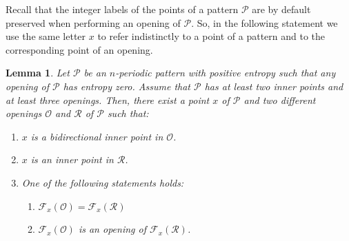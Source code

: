 \documentclass[a4paper]{amsart}
\newtheorem{lemma}[theorem]{Lemma}
\theoremstyle{definition}
\begin{document}
Recall that the integer labels of the points of a pattern $\mathcal{P}$ are by default preserved when performing an opening of $\mathcal{P}$. So, in the following statement we use the same letter $x$ to refer indistinctly to a point of a pattern and to the corresponding point of an opening.

\begin{lemma}\label{2inners_3op_QR}
Let $\mathcal{P}$ be an $n$-periodic pattern with positive entropy such that any opening of $\mathcal{P}$ has entropy zero.
Assume that $\mathcal{P}$ has at least two inner points and at least three openings. Then, there exist a point $x$ of $\mathcal{P}$ and
two different openings $\mathcal{O}$ and $\mathcal{R}$ of $\mathcal{P}$ such that:
\begin{enumerate}
\item $x$ is a bidirectional inner point in $\mathcal{O}$.
\item $x$ is an inner point in $\mathcal{R}$.
\item One of the following statements holds:
\begin{enumerate}
\item[(c1)] $\mathcal{F}_x(\mathcal{O})=\mathcal{F}_x(\mathcal{R})$
\item[(c2)] $\mathcal{F}_x(\mathcal{O})$ is an opening of $\mathcal{F}_x(\mathcal{R})$.
\end{enumerate}
\end{enumerate}
\end{lemma}
\end{document}

